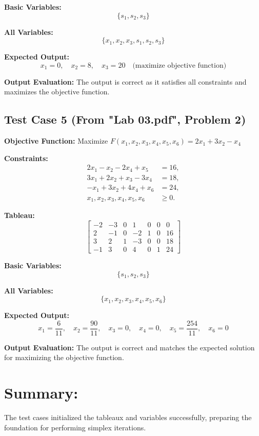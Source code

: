\documentclass[12pt, legalpaper]{exam}
\begin{document}
\textbf{Basic Variables:}
\[
\{ s_1, s_2, s_3 \}
\]

\textbf{All Variables:}
\[
\{ x_1, x_2, x_3, s_1, s_2, s_3 \}
\]

\textbf{Expected Output:}
\[
x_1 = 0, \quad x_2 = 8, \quad x_3 = 20 \quad \text{(maximize objective function)}
\]

\textbf{Output Evaluation:} The output is correct as it satisfies all constraints and maximizes the objective function.

\subsection*{Test Case 5 (From "Lab 03.pdf", Problem 2)}

\textbf{Objective Function:} Maximize \( F(x_1, x_2, x_3, x_4, x_5, x_6) = 2x_1 + 3x_2 - x_4 \)

\textbf{Constraints:}
\[
\begin{aligned}
2x_1 - x_2 - 2x_4 + x_5 &= 16, \\
3x_1 + 2x_2 + x_3 - 3x_4 &= 18, \\
-x_1 + 3x_2 + 4x_4 + x_6 &= 24, \\
x_1, x_2, x_3, x_4, x_5, x_6 &\geq 0.
\end{aligned}
\]

\textbf{Tableau:}
\[
\begin{bmatrix}
-2 & -3 & 0 & 1 & 0 & 0 & 0 \\
2 & -1 & 0 & -2 & 1 & 0 & 16 \\
3 & 2 & 1 & -3 & 0 & 0 & 18 \\
-1 & 3 & 0 & 4 & 0 & 1 & 24
\end{bmatrix}
\]

\textbf{Basic Variables:}
\[
\{ s_1, s_2, s_3 \}
\]

\textbf{All Variables:}
\[
\{ x_1, x_2, x_3, x_4, x_5, x_6 \}
\]

\textbf{Expected Output:}
\[
x_1 = \frac{6}{11}, \quad x_2 = \frac{90}{11}, \quad x_3 = 0, \quad x_4 = 0, \quad x_5 = \frac{254}{11}, \quad x_6 = 0
\]

\textbf{Output Evaluation:} The output is correct and matches the expected solution for maximizing the objective function.

\section*{Summary:}
The test cases initialized the tableaux and variables successfully, preparing the foundation for performing simplex iterations.
\vspace{12pt}
\end{document}
